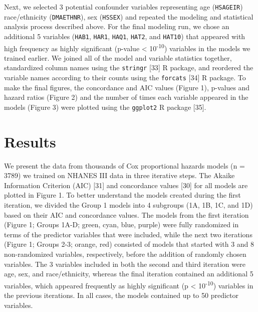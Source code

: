 \documentclass[12pt,oneside]{reedthesis}
\theoremstyle{definition}
\theoremstyle{definition}
\theoremstyle{definition}
\theoremstyle{remark}
\begin{document}
Next, we selected 3 potential confounder variables representing age
(\texttt{HSAGEIR}) race/ethnicity (\texttt{DMAETHNR}), sex
(\texttt{HSSEX}) and repeated the modeling and statistical analysis
process described above. For the final modeling run, we chose an
additional 5 variables (\texttt{HAB1}, \texttt{HAR1}, \texttt{HAQ1},
\texttt{HAT2}, and \texttt{HAT10}) that appeared with high frequency as
highly significant (p-value \textless{} 10\textsuperscript{-10})
variables in the models we trained earlier. We joined all of the model
and variable statistics together, standardized column names using the
\texttt{stringr} {[}33{]} R package, and reordered the variable names
according to their counts using the \texttt{forcats} {[}34{]} R package.
To make the final figures, the concordance and AIC values (Figure 1),
p-values and hazard ratios (Figure 2) and the number of times each
variable appeared in the models (Figure 3) were plotted using the
\texttt{ggplot2} R package {[}35{]}.

\hypertarget{results}{%
\section*{Results}\label{results}}

We present the data from thousands of Cox proportional hazards models (n
= 3789) we trained on NHANES III data in three iterative steps. The
Akaike Information Criterion (AIC) {[}31{]} and concordance values
{[}30{]} for all models are plotted in Figure 1. To better understand
the models created during the first iteration, we divided the Group 1
models into 4 subgroups (1A, 1B, 1C, and 1D) based on their AIC and
concordance values. The models from the first iteration (Figure 1;
Groups 1A-D; green, cyan, blue, purple) were fully randomized in terms
of the predictor variables that were included, while the next two
iterations (Figure 1; Groups 2-3; orange, red) consisted of models that
started with 3 and 8 non-randomized variables, respectively, before the
addition of randomly chosen variables. The 3 variables included in both
the second and third iteration were age, sex, and race/ethnicity,
whereas the final iteration contained an additional 5 variables, which
appeared frequently as highly significant (p \textless{}
10\textsuperscript{-10}) variables in the previous iterations. In all
cases, the models contained up to 50 predictor variables.
\end{document}
